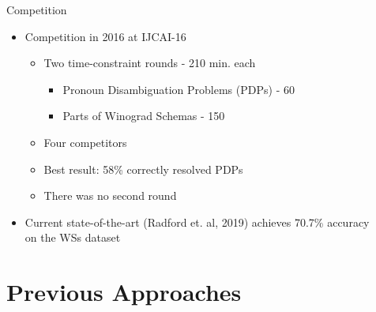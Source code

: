 \documentclass[smaller,dvipsnames,ratio=169]{beamer}
\begin{document}
\begin{frame}{Competition}
	
	\begin{itemize}
		\normalsize
		\item Competition in 2016 at IJCAI-16
		\begin{itemize}
			\normalsize
			\item Two time-constraint rounds - 210 min. each
		\begin{itemize}
			\normalsize
			\item Pronoun Disambiguation Problems (PDPs) - 60
			\item Parts of Winograd Schemas - 150
		\end{itemize}
		\item Four competitors
		\item Best result: 58\% correctly resolved PDPs
		\item There was no second round
		
		\end{itemize}
	
	\item Current \alert{state-of-the-art} (Radford et. al, 2019) achieves 70.7\% accuracy\\ on the WSs dataset
	\end{itemize}
	
\end{frame}

\section{Previous Approaches}
\end{document}
